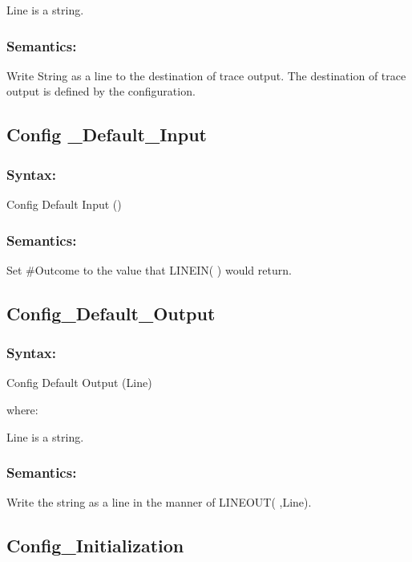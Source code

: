 Line is a string.

\subsubsection{Semantics:}\label{semantics-39}

Write String as a line to the destination of trace output. The
destination of trace output is defined by the configuration.

\subsection{Config \_Default\_Input}\label{config-_default_input}

\subsubsection{Syntax:}\label{syntax-39}

Config Default Input ()

\subsubsection{Semantics:}\label{semantics-40}

Set \#Outcome to the value that LINEIN( ) would return.

\subsection{Config\_Default\_Output}\label{config_default_output}

\subsubsection{Syntax:}\label{syntax-40}

Config Default Output (Line)

where:

Line is a string.

\subsubsection{Semantics:}\label{semantics-41}

Write the string as a line in the manner of LINEOUT( ,Line).

\subsection{Config\_Initialization}\label{config_initialization}

